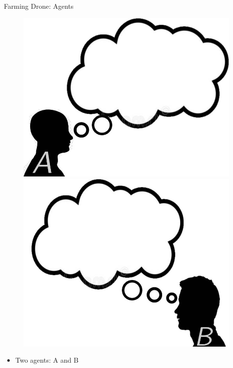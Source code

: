 \documentclass{beamer}
\begin{document}
\begin{frame}{Farming Drone: Agents}
    \begin{figure}
        \centering
        \includegraphics[scale=0.2]{images/a-expects.jpg}
        \includegraphics[scale=0.2]{images/b-expects.jpg}
    \end{figure}
    \begin{itemize}
        \item Two agents: A and B
    \end{itemize}
\end{frame}
\end{document}
